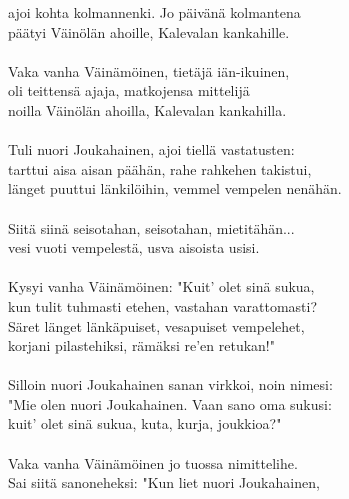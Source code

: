 ajoi kohta kolmannenki. Jo päivänä kolmantena                 \\
päätyi Väinölän ahoille, Kalevalan kankahille.                \\
                                                              \\
Vaka vanha Väinämöinen, tietäjä iän-ikuinen,                  \\
oli teittensä ajaja, matkojensa mittelijä                     \\
noilla Väinölän ahoilla, Kalevalan kankahilla.                \\
                                                              \\
Tuli nuori Joukahainen, ajoi tiellä vastatusten:              \\
tarttui aisa aisan päähän, rahe rahkehen takistui,            \\
länget puuttui länkilöihin, vemmel vempelen nenähän.          \\
                                                              \\
Siitä siinä seisotahan, seisotahan, mietitähän...             \\
vesi vuoti vempelestä, usva aisoista usisi.                   \\
                                                              \\
Kysyi vanha Väinämöinen: "Kuit' olet sinä sukua,              \\
kun tulit tuhmasti etehen, vastahan varattomasti?             \\
Säret länget länkäpuiset, vesapuiset vempelehet,              \\
korjani pilastehiksi, rämäksi re'en retukan!"                 \\
                                                              \\
Silloin nuori Joukahainen sanan virkkoi, noin nimesi:         \\
"Mie olen nuori Joukahainen. Vaan sano oma sukusi:            \\
kuit' olet sinä sukua, kuta, kurja, joukkioa?"                \\
                                                              \\
Vaka vanha Väinämöinen jo tuossa nimittelihe.                 \\
Sai siitä sanoneheksi: "Kun liet nuori Joukahainen,           \\
